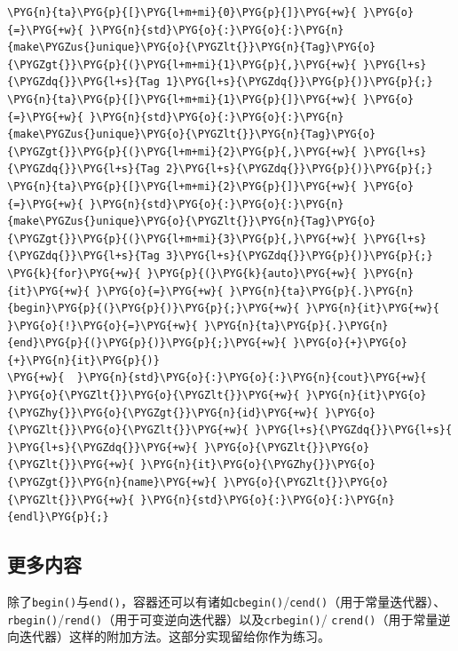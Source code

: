 \begin{codeblockbg}
\begin{Verbatim}[commandchars=\\\{\},breaklines=true,breakanywhere=true,fontsize=\codefont,xleftmargin=17bp]
\PYG{n}{ta}\PYG{p}{[}\PYG{l+m+mi}{0}\PYG{p}{]}\PYG{+w}{ }\PYG{o}{=}\PYG{+w}{ }\PYG{n}{std}\PYG{o}{:}\PYG{o}{:}\PYG{n}{make\PYGZus{}unique}\PYG{o}{\PYGZlt{}}\PYG{n}{Tag}\PYG{o}{\PYGZgt{}}\PYG{p}{(}\PYG{l+m+mi}{1}\PYG{p}{,}\PYG{+w}{ }\PYG{l+s}{\PYGZdq{}}\PYG{l+s}{Tag 1}\PYG{l+s}{\PYGZdq{}}\PYG{p}{)}\PYG{p}{;}
\PYG{n}{ta}\PYG{p}{[}\PYG{l+m+mi}{1}\PYG{p}{]}\PYG{+w}{ }\PYG{o}{=}\PYG{+w}{ }\PYG{n}{std}\PYG{o}{:}\PYG{o}{:}\PYG{n}{make\PYGZus{}unique}\PYG{o}{\PYGZlt{}}\PYG{n}{Tag}\PYG{o}{\PYGZgt{}}\PYG{p}{(}\PYG{l+m+mi}{2}\PYG{p}{,}\PYG{+w}{ }\PYG{l+s}{\PYGZdq{}}\PYG{l+s}{Tag 2}\PYG{l+s}{\PYGZdq{}}\PYG{p}{)}\PYG{p}{;}
\PYG{n}{ta}\PYG{p}{[}\PYG{l+m+mi}{2}\PYG{p}{]}\PYG{+w}{ }\PYG{o}{=}\PYG{+w}{ }\PYG{n}{std}\PYG{o}{:}\PYG{o}{:}\PYG{n}{make\PYGZus{}unique}\PYG{o}{\PYGZlt{}}\PYG{n}{Tag}\PYG{o}{\PYGZgt{}}\PYG{p}{(}\PYG{l+m+mi}{3}\PYG{p}{,}\PYG{+w}{ }\PYG{l+s}{\PYGZdq{}}\PYG{l+s}{Tag 3}\PYG{l+s}{\PYGZdq{}}\PYG{p}{)}\PYG{p}{;}
\PYG{k}{for}\PYG{+w}{ }\PYG{p}{(}\PYG{k}{auto}\PYG{+w}{ }\PYG{n}{it}\PYG{+w}{ }\PYG{o}{=}\PYG{+w}{ }\PYG{n}{ta}\PYG{p}{.}\PYG{n}{begin}\PYG{p}{(}\PYG{p}{)}\PYG{p}{;}\PYG{+w}{ }\PYG{n}{it}\PYG{+w}{ }\PYG{o}{!}\PYG{o}{=}\PYG{+w}{ }\PYG{n}{ta}\PYG{p}{.}\PYG{n}{end}\PYG{p}{(}\PYG{p}{)}\PYG{p}{;}\PYG{+w}{ }\PYG{o}{+}\PYG{o}{+}\PYG{n}{it}\PYG{p}{)}
\PYG{+w}{  }\PYG{n}{std}\PYG{o}{:}\PYG{o}{:}\PYG{n}{cout}\PYG{+w}{ }\PYG{o}{\PYGZlt{}}\PYG{o}{\PYGZlt{}}\PYG{+w}{ }\PYG{n}{it}\PYG{o}{\PYGZhy{}}\PYG{o}{\PYGZgt{}}\PYG{n}{id}\PYG{+w}{ }\PYG{o}{\PYGZlt{}}\PYG{o}{\PYGZlt{}}\PYG{+w}{ }\PYG{l+s}{\PYGZdq{}}\PYG{l+s}{ }\PYG{l+s}{\PYGZdq{}}\PYG{+w}{ }\PYG{o}{\PYGZlt{}}\PYG{o}{\PYGZlt{}}\PYG{+w}{ }\PYG{n}{it}\PYG{o}{\PYGZhy{}}\PYG{o}{\PYGZgt{}}\PYG{n}{name}\PYG{+w}{ }\PYG{o}{\PYGZlt{}}\PYG{o}{\PYGZlt{}}\PYG{+w}{ }\PYG{n}{std}\PYG{o}{:}\PYG{o}{:}\PYG{n}{endl}\PYG{p}{;}
\end{Verbatim}
\end{codeblockbg}



\subsection{更多内容}



除了\texttt{begin()}与\texttt{end()}，容器还可以有诸如\texttt{cbegin()}/\texttt{cend()}（用于常量迭代器）、\texttt{rbegin()}/\texttt{rend()}（用于可变逆向迭代器）以及\texttt{crbegin()}/ \texttt{crend()}（用于常量逆向迭代器）这样的附加方法。这部分实现留给你作为练习。



